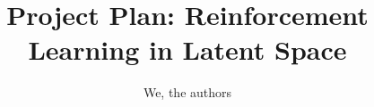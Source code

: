 \documentclass[11pt]{article}
\title{Project Plan: Reinforcement Learning in Latent Space}
\author{We, the authors}
\begin{document}
\maketitle








{\tiny\printbibliography}

\clearpage
\raggedbottom
\appendix
\begin{appendix}
\end{appendix}
\end{document}
